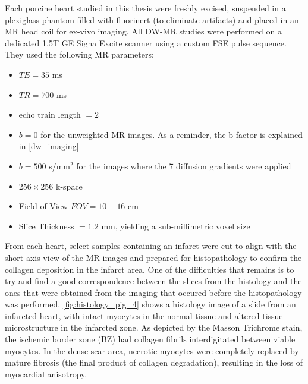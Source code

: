 Each porcine heart studied in this thesis were freshly excised, suspended in a plexiglass phantom filled with fluorinert (to eliminate artifacts) and placed in an MR head coil for ex-vivo imaging. All DW-MR studies were performed on a dedicated 1.5T GE Signa Excite scanner using a custom FSE pulse sequence. They used the following MR parameters: 
\begin{itemize}
    \item $TE = 35$ ms
    \item $TR = 700$ ms
    \item echo train length $=2$
    \item $b = 0$ for the unweighted MR images. As a reminder, the b factor is explained in \ref{dw_imaging}
    \item $b = 500 $ s/$\text{mm}^2$ for the images where the 7 diffusion gradients were applied
    \item $256 \times 256$ k-space
    \item Field of View $FOV = 10-16$ cm
    \item Slice Thickness $ = 1.2$ mm, yielding a sub-millimetric voxel size
\end{itemize}
From each heart, select samples containing an infarct were cut to align with the short-axis view of the MR images and prepared for histopathology to confirm the collagen deposition in the infarct area. One of the difficulties that remains is to try and find a good correspondence between the slices from the histology and the ones that were obtained from the imaging that occured before the histopathology was performed.  \ref{fig:histology_pig_4} shows a histology image of a slide from an infarcted heart, with intact myocytes in the normal tissue and altered tissue microstructure in the infarcted zone. As depicted by the Masson Trichrome stain, the ischemic border zone (BZ) had collagen fibrils interdigitated between viable myocytes. In the dense scar area, necrotic myocytes were completely replaced by mature fibrosis (the final product of collagen degradation), resulting in the loss of myocardial anisotropy.\\\\\\

